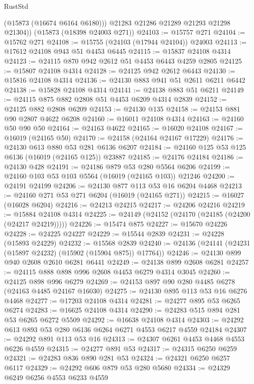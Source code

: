 \begin{lexlean}{RustStd}
\begin{coremodule}
          (@15873 (@16674 @6164 @6180)))
        @21283
        @21286
        @21289
        @21293
        @21298
        @21304))
    (@15873 (@18398 @24003 @271))
@24103 := @15757 @271
@24104 := @15762 @271
@24108 := @15755 (@24103 (@17944 @24104)) @24003
@24113 := @17612 @24108 @943 @51 @4453 @6445
@24115 := @15837 @24108 @4314
@24123 := @24115 @870 @942 @2612 @51 @4453 @6443 @4259 @2805
@24125 := @15807 @24108 @4314
@24128 := @24125 @942 @2612 @6443
@24130 := @15816 @24108 @4314
@24136 := @24130 @883 @941 @51 @2611 @6211 @6442
@24138 := @15828 @24108 @4314
@24141 := @24138 @883 @51 @6211
@24149 := @24115 @875 @882 @2808 @51 @4453 @6209 @4314 @2839
@24152 := @24125 @882 @2808 @6209
@24153 := @24130 @135
@24158 := @24153 @881 @90 @2807 @4622 @6208
@24160 := @16011 @24108 @4314
@24163 := @24160 @50 @90 @50
@24164 := @24163 @4622
@24165 := @16020 @24108
@24167 := @16019 (@24165 @50)
@24170 := @24158 (@24164 @24167 @17229)
@24176 := @24130 @613 @880 @53 @281 @6136 @6207
@24184 := @24160 @125 @53 @125 @6136 (@16019 (@24165 @125)) @23887
@24185 := @24176 @24184
@24186 := @24130 @428
@24191 := @24186 @879 @53 @280 @5564 @6206
@24199 := @24160 @103 @53 @103 @5564 (@16019 (@24165 @103)) @21246
@24200 := @24191 @24199
@24206 := @24130 @877 @113 @53 @16 @6204 @4468
@24213 := @24160 @271 @53 @271 @6204 (@16019 (@24165 @271))
@24215 := @16027 (@16028 @6204)
@24216 := @24213 @24215
@24217 := @24206 @24216
@24219 := @15884 @24108 @4314
@24225 := @24149 (@24152 (@24170 (@24185 (@24200 (@24217 @24219)))))
@24226 := @15474 @875
@24227 := @15670 @24226
@24228 := @24225 @24227
@24229 := @15544 @2839
@24231 := @24228 (@15893 @24229)
@24232 := @15568 @2839
@24240 := @24136 (@24141 (@24231 (@15897 @24232) (@15902 (@15904 @875)) @17764))
@24246 := @24130 @899 @940 @2608 @2610 @6281 @6441
@24249 := @24138 @899 @2608 @6281
@24257 := @24115 @888 @898 @996 @2608 @4453 @6279 @4314 @3045
@24260 := @24125 @898 @996 @6279
@24269 := @24153 @897 @90 @280 @4485 @6278 (@24163 @4485 @24167 @16030)
@24275 := @24130 @895 @113 @53 @16 @6276 @4468
@24277 := @17203 @24108 @4314
@24281 := @24277 @895 @53 @6265 @6274
@24283 := @16625 @24108 @4314
@24290 := @24283 @515 @894 @281 @53 @6265 @6272 @5509
@24292 := @16638 @24108 @4314
@24303 := @24292 @613 @893 @53 @280 @6136 @6264 @6271 @4553 @6217 @4559 @24184
@24307 := @24292 @891 @113 @53 @16
@24313 := @24307 @6261 @4453 @4468 @4553 @6226 @4559
@24315 := @24277 @891 @53
@24317 := @24315 @6250 @6259
@24321 := @24283 @836 @890 @281 @53
@24324 := @24321 @6250 @6257 @6117
@24329 := @24292 @606 @879 @53 @280 @5680
@24334 := @24329 @6249 @6256 @4553 @6233 @4559

\end{coremodule}
\end{lexlean}
